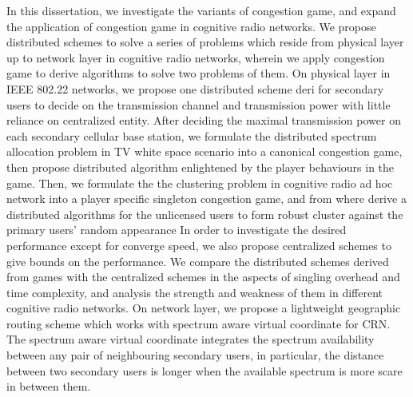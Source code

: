 In this dissertation, we investigate the variants of congestion game, and expand the application of congestion game in cognitive radio networks.
We propose distributed schemes to solve a series of problems which reside from physical layer up to network layer in cognitive radio networks, wherein we apply congestion game to derive algorithms to solve two problems of them.
%
On physical layer in IEEE 802.22 networks, we propose one distributed scheme deri	for secondary users to decide on the transmission channel and transmission power with little reliance on centralized entity.
After deciding the maximal transmission power on each secondary cellular base station, we formulate the distributed spectrum allocation problem in TV white space scenario into a canonical congestion game, then propose distributed algorithm enlightened by the player behaviours in the game.
%
Then, we formulate the the clustering problem in cognitive radio ad hoc network into a player specific singleton congestion game, and from where derive a distributed algorithms for the unlicensed users to form robust cluster against the primary users' random appearance
In order to investigate the desired performance except for converge speed, we also propose centralized schemes to give bounds on the performance.
We compare the distributed schemes derived from games with the centralized schemes in the aspects of singling overhead and time complexity, and analysis the strength and weakness of them in different cognitive radio networks.
%
On network layer, we propose a lightweight geographic routing scheme which works with spectrum aware virtual coordinate for CRN. 
The spectrum aware virtual coordinate integrates the spectrum availability between any pair of neighbouring secondary users, in particular, the distance between two secondary users is longer when the available spectrum is more scare in between them.
%




